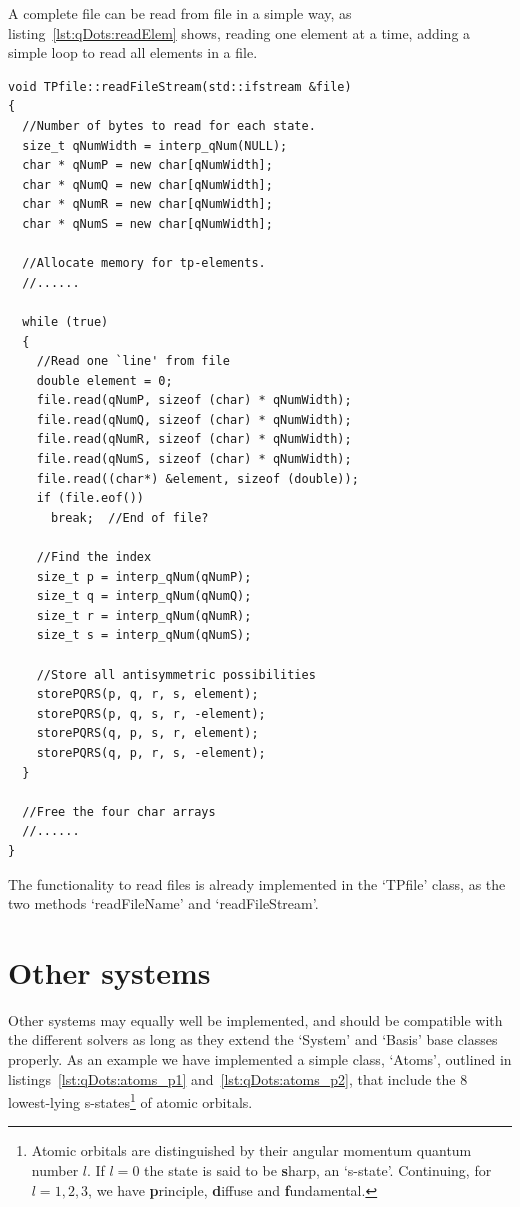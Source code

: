 A complete file can be read from file in a simple way, as listing~\ref{lst:qDots:readElem} shows, reading one element at a time, adding a  simple loop to read all elements in a file.
\begin{lstlisting}[float,label={lst:qDots:readElem},caption={How to read two-particle elements from file.}]
void TPfile::readFileStream(std::ifstream &file)
{
  //Number of bytes to read for each state.
  size_t qNumWidth = interp_qNum(NULL);
  char * qNumP = new char[qNumWidth];
  char * qNumQ = new char[qNumWidth];
  char * qNumR = new char[qNumWidth];
  char * qNumS = new char[qNumWidth];

  //Allocate memory for tp-elements.
  //......

  while (true)
  {
    //Read one `line' from file
    double element = 0;
    file.read(qNumP, sizeof (char) * qNumWidth);
    file.read(qNumQ, sizeof (char) * qNumWidth);
    file.read(qNumR, sizeof (char) * qNumWidth);
    file.read(qNumS, sizeof (char) * qNumWidth);
    file.read((char*) &element, sizeof (double));
    if (file.eof())
      break;  //End of file?

	//Find the index
    size_t p = interp_qNum(qNumP);
    size_t q = interp_qNum(qNumQ);
    size_t r = interp_qNum(qNumR);
    size_t s = interp_qNum(qNumS);

    //Store all antisymmetric possibilities 
    storePQRS(p, q, r, s, element);
    storePQRS(p, q, s, r, -element);
    storePQRS(q, p, s, r, element);
    storePQRS(q, p, r, s, -element);
  }

  //Free the four char arrays
  //......
}
\end{lstlisting}
The functionality to read files is already implemented in the `TPfile' class, as the two methods `readFileName' and `readFileStream'.






\section{Other systems}
Other systems may equally well be implemented, and should be compatible with the different solvers as long as they extend the `System' and `Basis' base classes properly.
As an example we have implemented a simple class, `Atoms', outlined in listings~\ref{lst:qDots:atoms_p1} and~\ref{lst:qDots:atoms_p2}, that include the 8 lowest-lying s-states\footnote{Atomic orbitals are distinguished by their angular momentum quantum number $l$. If $l=0$ the state is said to be \textbf{s}harp, an `s-state'. Continuing, for $l=1,2,3$, we have \textbf{p}rinciple, \textbf{d}iffuse and \textbf{f}undamental.} of atomic orbitals.

